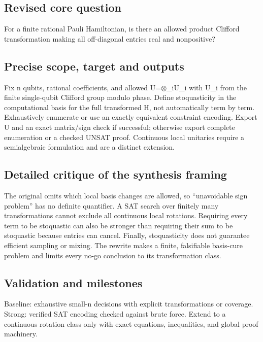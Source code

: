 \documentclass[
  11pt,
]{article}
\begin{document}
\subsection{Revised core question}

For a finite rational Pauli Hamiltonian, is there an allowed product
Clifford transformation making all off-diagonal entries real and
nonpositive?

\subsection{Precise scope, target and outputs}

Fix n qubits, rational coefficients, and allowed
U=\ensuremath{\otimes}\_iU\_i with U\_i from the finite single-qubit
Clifford group modulo phase. Define stoquasticity in the computational
basis for the full transformed H, not automatically term by term.
Exhaustively enumerate or use an exactly equivalent constraint encoding.
Export U and an exact matrix/sign check if successful; otherwise export
complete enumeration or a checked UNSAT proof. Continuous local
unitaries require a semialgebraic formulation and are a distinct
extension.

\subsection{Detailed critique of the synthesis framing}

The original omits which local basis changes are allowed, so
``unavoidable sign problem'' has no definite quantifier. A SAT search
over finitely many transformations cannot exclude all continuous local
rotations. Requiring every term to be stoquastic can also be stronger
than requiring their sum to be stoquastic because entries can cancel.
Finally, stoquasticity does not guarantee efficient sampling or mixing.
The rewrite makes a finite, falsifiable basis-cure problem and limits
every no-go conclusion to its transformation class.

\subsection{Validation and milestones}

Baseline: exhaustive small-n decisions with explicit transformations or
coverage. Strong: verified SAT encoding checked against brute force.
Extend to a continuous rotation class only with exact equations,
inequalities, and global proof machinery.
\end{document}

